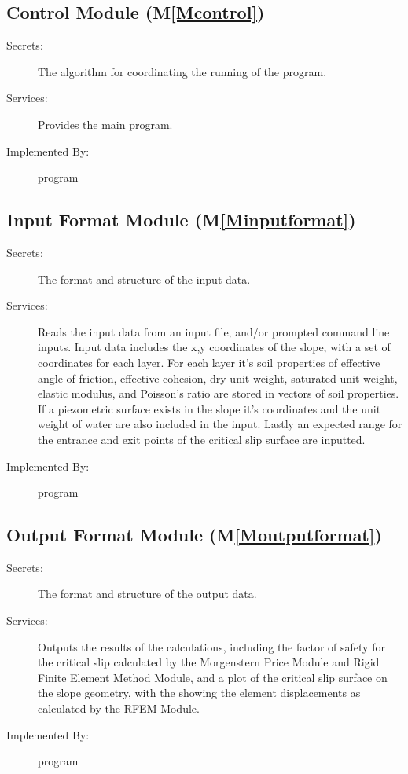 \documentclass[12pt]{article}
\begin{document}
\subsection{Control Module (M\ref{Mcontrol})}
\label{Sec:CM()}
\begin{description}
\item[Secrets:]The algorithm for coordinating the running of the program.
\item[Services:]Provides the main program.
\item[Implemented By:]program
\end{description}
\subsection{Input Format Module (M\ref{Minputformat})}
\label{Sec:IFM()}
\begin{description}
\item[Secrets:]The format and structure of the input data.
\item[Services:]Reads the input data from an input file, and/or prompted command line inputs. Input data includes the x,y coordinates of the slope, with a set of coordinates for each layer. For each layer it's soil properties of effective angle of friction, effective cohesion, dry unit weight, saturated unit weight, elastic modulus, and Poisson's ratio are stored in vectors of soil properties. If a piezometric surface exists in the slope it's coordinates and the unit weight of water are also included in the input. Lastly an expected range for the entrance and exit points of the critical slip surface are inputted.
\item[Implemented By:]program
\end{description}
\subsection{Output Format Module (M\ref{Moutputformat})}
\label{Sec:OFM()}
\begin{description}
\item[Secrets:]The format and structure of the output data.
\item[Services:]Outputs the results of the calculations, including the factor of safety for the critical slip calculated by the Morgenstern Price Module and Rigid Finite Element Method Module, and a plot of the critical slip surface on the slope geometry, with the showing the element displacements as calculated by the RFEM Module.
\item[Implemented By:]program
\end{description}
\end{document}
